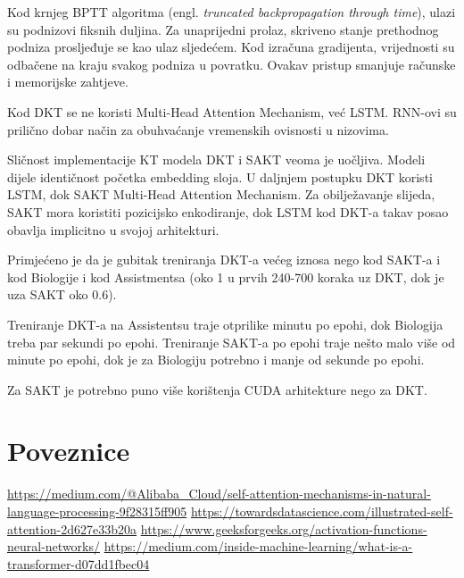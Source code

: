 		Kod krnjeg BPTT algoritma (engl. \textit{truncated backpropagation through time}), ulazi su podnizovi fiksnih duljina. Za unaprijedni prolaz, skriveno stanje prethodnog podniza prosljeđuje se kao ulaz sljedećem. Kod izračuna gradijenta, vrijednosti su odbačene na kraju svakog podniza u povratku. Ovakav pristup smanjuje računske i memorijske zahtjeve.

		Kod DKT se ne koristi Multi-Head Attention Mechanism, već LSTM. RNN-ovi su prilično dobar način za obuhvaćanje vremenskih ovisnosti u nizovima.

		Sličnost implementacije KT modela DKT i SAKT veoma je uočljiva. Modeli dijele identičnost početka embedding sloja. U daljnjem postupku DKT koristi LSTM, dok SAKT Multi-Head Attention Mechanism. Za obilježavanje slijeda, SAKT mora koristiti pozicijsko enkodiranje, dok LSTM kod DKT-a takav posao obavlja implicitno u svojoj arhitekturi.
	
		Primjećeno je da je gubitak treniranja DKT-a većeg iznosa nego kod SAKT-a i kod Biologije i kod Assistmentsa (oko 1 u prvih 240-700 koraka uz DKT, dok je uza SAKT oko 0.6). 

		Treniranje DKT-a na Assistentsu traje otprilike minutu po epohi, dok Biologija treba par sekundi po epohi.
		Treniranje SAKT-a po epohi traje nešto malo više od minute po epohi, dok je za Biologiju potrebno i manje od sekunde po epohi.

		Za SAKT je potrebno puno više korištenja CUDA arhitekture nego za DKT.
		
	\section{Poveznice}
\url{https://medium.com/@Alibaba_Cloud/self-attention-mechanisms-in-natural-language-processing-9f28315ff905}
\url{https://towardsdatascience.com/illustrated-self-attention-2d627e33b20a}
\url{https://www.geeksforgeeks.org/activation-functions-neural-networks/}
\url{https://medium.com/inside-machine-learning/what-is-a-transformer-d07dd1fbec04}


